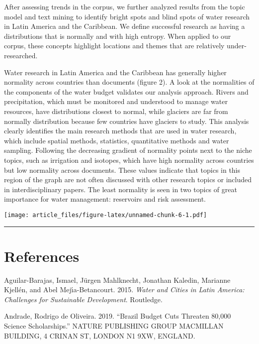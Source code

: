 \documentclass[]{article}
\begin{document}
After assessing trends in the corpus, we further analyzed results from
the topic model and text mining to identify bright spots and blind spots
of water research in Latin America and the Caribbean. We define
successful research as having a distributions that is normally and with
high entropy. When applied to our corpus, these concepts highlight
locations and themes that are relatively under-researched.

Water research in Latin America and the Caribbean has generally higher
normality across countries than documents (figure 2). A look at the
normalities of the components of the water budget validates our analysis
approach. Rivers and precipitation, which must be monitored and
understood to manage water resources, have distributions closest to
normal, while glaciers are far from normally distribution because few
countries have glaciers to study. This analysis clearly identifies the
main research methods that are used in water research, which include
spatial methods, statistics, quantitative methods and water sampling.
Following the decreasing gradient of normality points next to the niche
topics, such as irrigation and isotopes, which have high normality
across countries but low normality across documents. These values
indicate that topics in this region of the graph are not often discussed
with other research topics or included in interdisciplinary papers. The
least normality is seen in two topics of great importance for water
management: reservoirs and risk assessment.

\texttt{[image: article\_files/figure-latex/unnamed-chunk-6-1.pdf]}

\begin{center}\rule{0.5\linewidth}{\linethickness}\end{center}

\hypertarget{references}{%
\section*{References}\label{references}}

\hypertarget{refs}{}
\leavevmode\hypertarget{ref-Aguilar2015}{}%
Aguilar-Barajas, Ismael, Jürgen Mahlknecht, Jonathan Kaledin, Marianne
Kjellén, and Abel Mejı́a-Betancourt. 2015. \emph{Water and Cities in
Latin America: Challenges for Sustainable Development}. Routledge.

\leavevmode\hypertarget{ref-Andrade2019}{}%
Andrade, Rodrigo de Oliveira. 2019. ``Brazil Budget Cuts Threaten 80,000
Science Scholarships.'' NATURE PUBLISHING GROUP MACMILLAN BUILDING, 4
CRINAN ST, LONDON N1 9XW, ENGLAND.
\end{document}
